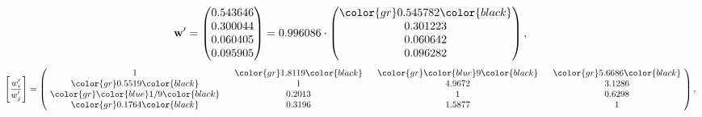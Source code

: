 \begin{example}
\begin{equation*}
\mathbf{w}^{\prime} =
\begin{pmatrix}
0.543646\\
0.300044\\
0.060405\\
0.095905
\end{pmatrix} =
0.996086\cdot
\begin{pmatrix}
\color{gr} 0.545782\color{black} \\
0.301223\\
0.060642\\
0.096282
\end{pmatrix},
\end{equation*}
\begin{equation*}
\left[ \frac{{w}^{\prime}_i}{{w}^{\prime}_j} \right] =
\begin{pmatrix}
$\,\,$ 1 $\,\,$ & $\,\,$\color{gr} 1.8119\color{black} $\,\,$ & $\,\,$\color{gr} \color{blue} 9\color{black} $\,\,$ & $\,\,$\color{gr} 5.6686\color{black} $\,\,$ \\
$\,\,$\color{gr} 0.5519\color{black} $\,\,$ & $\,\,$ 1 $\,\,$ & $\,\,$4.9672$\,\,$ & $\,\,$3.1286  $\,\,$ \\
$\,\,$\color{gr} \color{blue}  1/9\color{black} $\,\,$ & $\,\,$0.2013$\,\,$ & $\,\,$ 1 $\,\,$ & $\,\,$0.6298 $\,\,$ \\
$\,\,$\color{gr} 0.1764\color{black} $\,\,$ & $\,\,$0.3196$\,\,$ & $\,\,$1.5877$\,\,$ & $\,\,$ 1  $\,\,$ \\
\end{pmatrix},
\end{equation*}
\end{example}
\newpage
